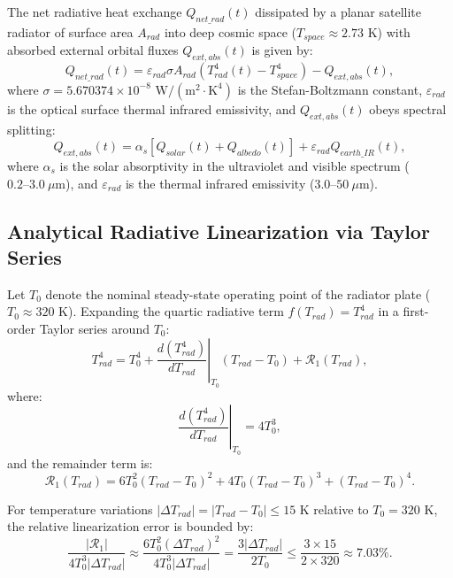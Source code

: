 \documentclass[11pt,a4paper]{article}
\begin{document}
The net radiative heat exchange $Q_{net\_rad}(t)$ dissipated by a planar satellite radiator of surface area $A_{rad}$ into deep cosmic space ($T_{space} \approx 2.73\text{ K}$) with absorbed external orbital fluxes $Q_{ext, abs}(t)$ is given by:
\begin{equation}
Q_{net\_rad}(t) = \varepsilon_{rad} \sigma A_{rad} \left( T_{rad}^4(t) - T_{space}^4 \right) - Q_{ext, abs}(t),
\end{equation}
where $\sigma = 5.670374 \times 10^{-8}\text{ W}/(\text{m}^2\cdot\text{K}^4)$ is the Stefan-Boltzmann constant, $\varepsilon_{rad}$ is the optical surface thermal infrared emissivity, and $Q_{ext, abs}(t)$ obeys spectral splitting:
\begin{equation}
Q_{ext, abs}(t) = \alpha_s \left[ Q_{solar}(t) + Q_{albedo}(t) \right] + \varepsilon_{rad} Q_{earth\_IR}(t),
\end{equation}
where $\alpha_s$ is the solar absorptivity in the ultraviolet and visible spectrum ($0.2\text{--}3.0\ \mu\text{m}$), and $\varepsilon_{rad}$ is the thermal infrared emissivity ($3.0\text{--}50\ \mu\text{m}$).

\subsection{Analytical Radiative Linearization via Taylor Series}
Let $T_0$ denote the nominal steady-state operating point of the radiator plate ($T_0 \approx 320\text{ K}$). Expanding the quartic radiative term $f(T_{rad}) = T_{rad}^4$ in a first-order Taylor series around $T_0$:
\begin{equation}
T_{rad}^4 = T_0^4 + \left. \frac{d(T_{rad}^4)}{dT_{rad}} \right|_{T_0} (T_{rad} - T_0) + \mathcal{R}_1(T_{rad}),
\end{equation}
where:
\begin{equation}
\left. \frac{d(T_{rad}^4)}{dT_{rad}} \right|_{T_0} = 4 T_0^3,
\end{equation}
and the remainder term is:
\begin{equation}
\mathcal{R}_1(T_{rad}) = 6 T_0^2 (T_{rad} - T_0)^2 + 4 T_0 (T_{rad} - T_0)^3 + (T_{rad} - T_0)^4.
\end{equation}

For temperature variations $|\Delta T_{rad}| = |T_{rad} - T_0| \le 15\text{ K}$ relative to $T_0 = 320\text{ K}$, the relative linearization error is bounded by:
\begin{equation}
\frac{|\mathcal{R}_1|}{4 T_0^3 |\Delta T_{rad}|} \approx \frac{6 T_0^2 (\Delta T_{rad})^2}{4 T_0^3 |\Delta T_{rad}|} = \frac{3 |\Delta T_{rad}|}{2 T_0} \le \frac{3 \times 15}{2 \times 320} \approx 7.03\%.
\end{equation}
\end{document}
